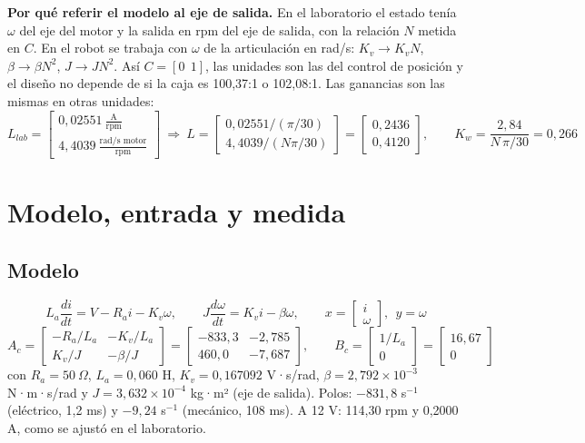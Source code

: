 \documentclass[11pt]{article}
\begin{document}
\textbf{Por qué referir el modelo al eje de salida.} En el laboratorio el estado tenía $\omega$ del eje del motor y la salida en rpm del eje de salida, con la relación $N$ metida en $C$. En el robot se trabaja con $\omega$ de la articulación en rad/s: $K_v\to K_vN$, $\beta\to\beta N^2$, $J\to JN^2$. Así $C=[0\ \ 1]$, las unidades son las del control de posición y el diseño no depende de si la caja es 100,37:1 o 102,08:1. Las ganancias son las mismas en otras unidades:
\[
L_{lab}=\begin{bmatrix}0{,}02551\ \tfrac{\text{A}}{\text{rpm}}\\ 4{,}4039\ \tfrac{\text{rad/s motor}}{\text{rpm}}\end{bmatrix}
\ \Rightarrow\
L=\begin{bmatrix}0{,}02551/(\pi/30)\\ 4{,}4039/(N\pi/30)\end{bmatrix}=\begin{bmatrix}0{,}2436\\ 0{,}4120\end{bmatrix},\qquad
K_{w}=\frac{2{,}84}{N\,\pi/30}=0{,}266
\]

\section{Modelo, entrada y medida}

\subsection*{Modelo}
\begin{equation}
L_a\frac{di}{dt}=V-R_ai-K_v\omega,\qquad J\frac{d\omega}{dt}=K_vi-\beta\omega,\qquad x=\begin{bmatrix}i\\ \omega\end{bmatrix},\ \ y=\omega
\end{equation}
\begin{equation}
A_c=\begin{bmatrix}-R_a/L_a & -K_v/L_a\\ K_v/J & -\beta/J\end{bmatrix}=\begin{bmatrix}-833{,}3 & -2{,}785\\ 460{,}0 & -7{,}687\end{bmatrix},\qquad
B_c=\begin{bmatrix}1/L_a\\ 0\end{bmatrix}=\begin{bmatrix}16{,}67\\ 0\end{bmatrix}
\end{equation}
con $R_a=50~\Omega$, $L_a=0{,}060$ H, $K_v=0{,}167092$ V·s/rad, $\beta=2{,}792\times10^{-3}$ N·m·s/rad y $J=3{,}632\times10^{-4}$ kg·m² (eje de salida). Polos: $-831{,}8$ s$^{-1}$ (eléctrico, 1,2 ms) y $-9{,}24$ s$^{-1}$ (mecánico, 108 ms). A 12 V: 114,30 rpm y 0,2000 A, como se ajustó en el laboratorio.
\end{document}
